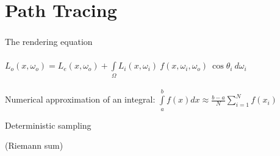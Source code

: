 \documentclass[utf8,stillsansserifmath,fleqn,t]{beamer}
\newcommand{\ds}{\displaystyle}
\begin{document}
\section{Path Tracing}

\begin{frame}
\frametitle{\insertsection}
The rendering equation\\
    ~\\
$\displaystyle L_o(x, \omega_o) = L_e(x, \omega_o) + \int\limits_\Omega
    L_i(x,\omega_i)~f(x,\omega_i,\omega_o)~\cos\theta_i~d\omega_i$\\
~\\[-1ex]
Numerical approximation of an integral: $\ds \int\limits_a^b f(x)dx \approx \frac{b-a}{N} \sum\limits_{i=1}^N f(x_i)$\\
\begin{minipage}{.48\textwidth}
\centerline{Deterministic sampling}
\centerline{(Riemann sum)}

\end{minipage}
\end{frame}
\end{document}
